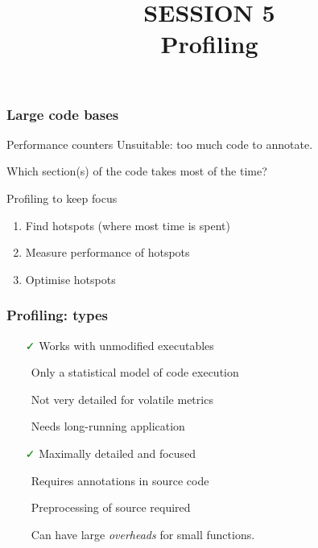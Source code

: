 \documentclass[dvipsnames,presentation,aspectratio=169,14pt]{beamer}
\date{}
\begin{document}
\title{\firasemibold\color{White}%
  {\fontsize{20}{0}\selectfont SESSION 5\\
    \fontsize{40}{40}\selectfont Profiling\par}}
\titleslide

\begin{frame}
  \frametitle{Large code bases}

  \begin{challenge}{Performance counters}
    Unsuitable: too much code to annotate.

    Which section(s) of the code takes most of the time?
  \end{challenge}

  \pause

  \begin{answer}{Profiling to keep focus}
    \begin{enumerate}
    \item Find hotspots (where most time is spent)
    \item Measure performance of hotspots
    \item Optimise hotspots
    \end{enumerate}
  \end{answer}
\end{frame}

\newcommand{\gooditem}{\textcolor{Green}{\faCheck}}
\newcommand{\baditem}{\textcolor{Red}{\faTimes\,}}

\begin{frame}
  \frametitle{Profiling: types}
        \begin{itemize}
        \item[\gooditem] Works with unmodified executables
        \item[\baditem] Only a statistical model of code execution
        \item[\baditem] Not very detailed for volatile metrics
        \item[\baditem] Needs long-running application
        \end{itemize}

        \vskip 5pt

        \begin{itemize}
        \item[\gooditem] Maximally detailed and focused
        \item[\baditem] Requires annotations in source code
        \item[\baditem] Preprocessing of source required
        \item[\baditem] Can have large \emph{overheads} for small functions.
        \end{itemize}
\end{frame}
\end{document}
